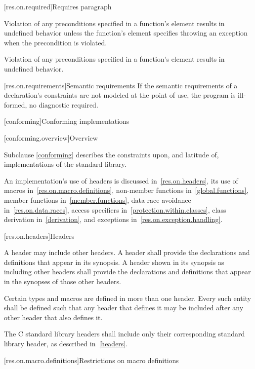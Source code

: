 [res.on.required]{Requires paragraph}

\pnum
{}%
Violation of any preconditions specified in a function's
\requires
element results in undefined behavior unless the function's
\throws
element specifies throwing an exception when the precondition is violated.

\pnum
Violation of any preconditions specified
in a function's \expects element
results in undefined behavior.

[res.on.requirements]{Semantic requirements}
\pnum
If the semantic requirements of a declaration's
constraints are not modeled at the point of use,
the program is ill-formed, no diagnostic required.

[conforming]{Conforming implementations}

[conforming.overview]{Overview}

\pnum
Subclause \ref{conforming} describes the constraints upon, and latitude of, implementations of the \Cpp{} standard library.

\pnum
An implementation's use of headers is discussed in~\ref{res.on.headers}, its use
of macros in~\ref{res.on.macro.definitions}, non-member functions
in~\ref{global.functions}, member functions in~\ref{member.functions}, data race
avoidance in~\ref{res.on.data.races}, access specifiers
in~\ref{protection.within.classes}, class derivation in~\ref{derivation}, and
exceptions in~\ref{res.on.exception.handling}.

[res.on.headers]{Headers}

\pnum
A \Cpp{} header may include other \Cpp{} headers.
A \Cpp{} header shall provide the declarations and definitions that appear in its
synopsis. A \Cpp{} header shown in its synopsis as including other \Cpp{} headers
shall provide the declarations and definitions that appear in the synopses of
those other headers.

\pnum
Certain types and macros are defined in more than one header.
Every such entity shall be defined such that any header that defines it may be
included after any other header that also defines it.

\pnum
The C standard library headers
shall include only their corresponding \Cpp{} standard library header,
as described in~\ref{headers}.

[res.on.macro.definitions]{Restrictions on macro definitions}
%

